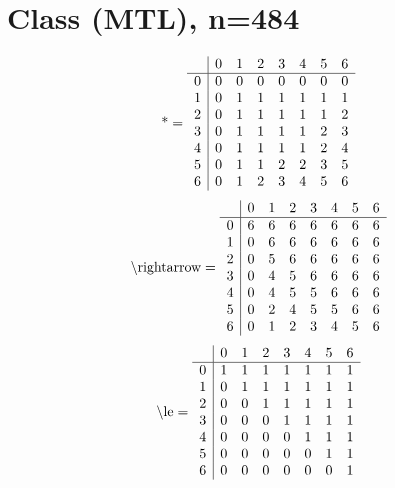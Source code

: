 \documentclass[11pt]{article}
\begin{document}
\section{Class (MTL), n=484}
\[\text{*} = 
\begin{array}{r | r r r r r r r}
 & 0 & 1 & 2 & 3 & 4 & 5 & 6 \\ \hline
0 & 0 & 0 & 0 & 0 & 0 & 0 & 0 \\
1 & 0 & 1 & 1 & 1 & 1 & 1 & 1 \\
2 & 0 & 1 & 1 & 1 & 1 & 1 & 2 \\
3 & 0 & 1 & 1 & 1 & 1 & 2 & 3 \\
4 & 0 & 1 & 1 & 1 & 1 & 2 & 4 \\
5 & 0 & 1 & 1 & 2 & 2 & 3 & 5 \\
6 & 0 & 1 & 2 & 3 & 4 & 5 & 6 \\
\end{array}
\]
\[\text{\textbackslash rightarrow} = 
\begin{array}{r | r r r r r r r}
 & 0 & 1 & 2 & 3 & 4 & 5 & 6 \\ \hline
0 & 6 & 6 & 6 & 6 & 6 & 6 & 6 \\
1 & 0 & 6 & 6 & 6 & 6 & 6 & 6 \\
2 & 0 & 5 & 6 & 6 & 6 & 6 & 6 \\
3 & 0 & 4 & 5 & 6 & 6 & 6 & 6 \\
4 & 0 & 4 & 5 & 5 & 6 & 6 & 6 \\
5 & 0 & 2 & 4 & 5 & 5 & 6 & 6 \\
6 & 0 & 1 & 2 & 3 & 4 & 5 & 6 \\
\end{array}
\]
\[\text{\textbackslash le} = 
\begin{array}{r | r r r r r r r}
 & 0 & 1 & 2 & 3 & 4 & 5 & 6 \\ \hline
0 & 1 & 1 & 1 & 1 & 1 & 1 & 1 \\
1 & 0 & 1 & 1 & 1 & 1 & 1 & 1 \\
2 & 0 & 0 & 1 & 1 & 1 & 1 & 1 \\
3 & 0 & 0 & 0 & 1 & 1 & 1 & 1 \\
4 & 0 & 0 & 0 & 0 & 1 & 1 & 1 \\
5 & 0 & 0 & 0 & 0 & 0 & 1 & 1 \\
6 & 0 & 0 & 0 & 0 & 0 & 0 & 1 \\
\end{array}
\]
\end{document}
